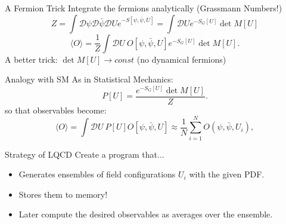 \documentclass[10pt]{beamer}
\begin{document}
\begin{frame}{A Fermion Trick}
	Integrate the fermions analytically (Grassmann Numbers!)
	\begin{equation}\nonumber
	Z = \int \mathcal{D}\psi\mathcal{D}\bar{\psi}\mathcal{D} U e^{-S[\psi,\bar{\psi},U] }  = \int \mathcal{D} U e^{-S_G[U] } \det M[U]
	\end{equation}
	\begin{equation}\nonumber
		\langle O \rangle = \frac{1}{Z}  \int \mathcal{D} U ~O[\psi, \bar{\psi}, U] e^{-S_G[U] } \det M[U] .
	\end{equation}
	A better trick: $ \det M[U] \rightarrow const$ (no dynamical fermions)
\end{frame}


\begin{frame}{Analogy with SM}
	As in Statistical Mechanics:
	\begin{equation}\nonumber
	P[U] = \frac{e^{-S_G[U]}\det M[U] }{Z}.
	\end{equation}
	so that observables become:
	\begin{equation}\nonumber
	\langle O \rangle =  \int \mathcal{D} U~ P[U] O[\psi, \bar{\psi}, U] \approx \frac{1}{N} \sum_{i=1}^N O(\psi,\bar{\psi}, U_i), 	\end{equation}
\end{frame}



\begin{frame}{Strategy of LQCD}
	Create a program that...
	\begin{itemize}%
		\item Generates ensembles of field configurations $U_i$ with the given PDF. 
		\item Stores them to memory!
		\item Later compute the desired observables as averages over the ensemble.
	\end{itemize}
\end{frame}


\end{document}
